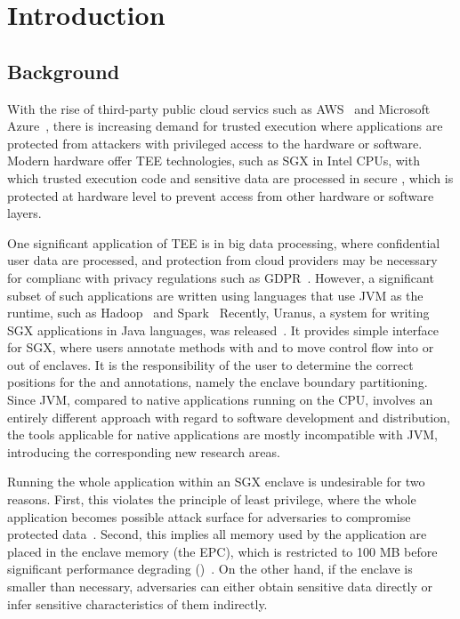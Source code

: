\section{Introduction}\label{sec:introduction}

\subsection{Background}\label{subsec:background}
With the rise of third-party public cloud servics
such as \ac{AWS}~\cite{aws} and Microsoft Azure~\cite{azure},
there is increasing demand for trusted execution where
applications are protected from
attackers with privileged access to the hardware or software.
Modern hardware offer \ac{TEE} technologies,
such as \ac{SGX} in Intel CPUs,
with which trusted execution code and sensitive data
are processed in secure ,
which is protected at hardware level to prevent access
from other hardware or software layers.

One significant application of \ac{TEE} is in big data processing,
where confidential user data are processed,
and protection from cloud providers may be necessary
for complianc with privacy regulations such as GDPR~\cite{gdpr}.
However, a significant subset of such applications are written
using languages that use \ac{JVM} as the runtime,
such as Hadoop~\cite{apachehadoop} and Spark~\cite{apachespark}
Recently, Uranus, a system for
writing \ac{SGX} applications in Java languages, was released~\cite{uranus}.
It provides simple interface for \ac{SGX},
where users annotate methods with  and 
to move control flow into or out of enclaves.
It is the responsibility of the user to determine the correct positions
for the  and  annotations,
namely the enclave boundary partitioning.
Since \ac{JVM}, compared to native applications running on the CPU,
involves an entirely different approach
with regard to software development and distribution,
the tools applicable for native applications are mostly incompatible with \ac{JVM},
introducing the corresponding new research areas.

Running the whole application within an \ac{SGX} enclave is undesirable for two reasons.
First, this violates the principle of least privilege,
where the whole application becomes possible attack surface
for adversaries to compromise protected data~\cite{glamdring}.
Second, this implies all memory used by the application
are placed in the enclave memory (the \ac{EPC}),
which is restricted to 100 MB before significant performance degrading
()~\cite{uranus}.
On the other hand, if the enclave is smaller than necessary,
adversaries can either obtain sensitive data directly or
infer sensitive characteristics of them indirectly.

